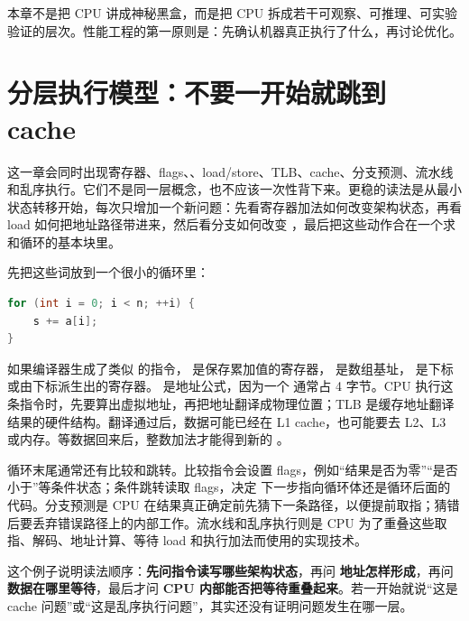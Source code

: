 \begin{keyidea}
本章不是把 CPU 讲成神秘黑盒，而是把 CPU 拆成若干可观察、可推理、可实验验证的层次。性能工程的第一原则是：先确认机器真正执行了什么，再讨论优化。
\end{keyidea}

\section{分层执行模型：不要一开始就跳到 cache}

这一章会同时出现寄存器、flags、、load/store、TLB、cache、分支预测、流水线和乱序执行。它们不是同一层概念，也不应该一次性背下来。更稳的读法是从最小状态转移开始，每次只增加一个新问题：先看寄存器加法如何改变架构状态，再看 load 如何把地址路径带进来，然后看分支如何改变 ，最后把这些动作合在一个求和循环的基本块里。

先把这些词放到一个很小的循环里：

\begin{lstlisting}[language=C++]
for (int i = 0; i < n; ++i) {
    s += a[i];
}
\end{lstlisting}

如果编译器生成了类似  的指令， 是保存累加值的寄存器， 是数组基址， 是下标或由下标派生出的寄存器。 是地址公式，因为一个  通常占 4 字节。CPU 执行这条指令时，先要算出虚拟地址，再把地址翻译成物理位置；TLB 是缓存地址翻译结果的硬件结构。翻译通过后，数据可能已经在 L1 cache，也可能要去 L2、L3 或内存。等数据回来后，整数加法才能得到新的 。

循环末尾通常还有比较和跳转。比较指令会设置 flags，例如“结果是否为零”“是否小于”等条件状态；条件跳转读取 flags，决定  下一步指向循环体还是循环后面的代码。分支预测是 CPU 在结果真正确定前先猜下一条路径，以便提前取指；猜错后要丢弃错误路径上的内部工作。流水线和乱序执行则是 CPU 为了重叠这些取指、解码、地址计算、等待 load 和执行加法而使用的实现技术。

这个例子说明读法顺序：\textbf{先问指令读写哪些架构状态}，再问 \textbf{地址怎样形成}，再问 \textbf{数据在哪里等待}，最后才问 \textbf{CPU 内部能否把等待重叠起来}。若一开始就说“这是 cache 问题”或“这是乱序执行问题”，其实还没有证明问题发生在哪一层。

